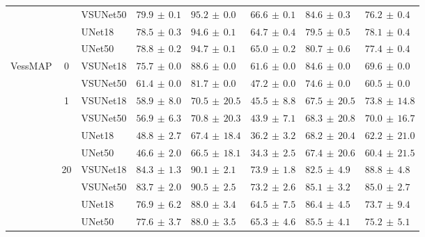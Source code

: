 \documentclass[%
reprint,
nofootinbib,
 amsmath,amssymb,
aps,
floatfix,
superscriptaddress,
showkeys,
longbibliography
]{revtex4-1}
\begin{document}
\begin{table}[t]
\begin{tabular}{l c l l l l l l}
         &  & VSUNet50 & $\mathbf{79.9} \,\pm\, 0.1$ & $95.2 \,\pm\, 0.0$ & $66.6 \,\pm\, 0.1$ & $84.6 \,\pm\, 0.3$ & $76.2 \,\pm\, 0.4$ \\
         &  & UNet18 & $78.5 \,\pm\, 0.3$ & $94.6 \,\pm\, 0.1$ & $64.7 \,\pm\, 0.4$ & $79.5 \,\pm\, 0.5$ & $78.1 \,\pm\, 0.4$ \\
         &  & UNet50 & $78.8 \,\pm\, 0.2$ & $94.7 \,\pm\, 0.1$ & $65.0 \,\pm\, 0.2$ & $80.7 \,\pm\, 0.6$ & $77.4 \,\pm\, 0.4$ \\
        \hline
        \multirow{10}{*}{VessMAP} & \multirow{2}{*}{0} & VSUNet18 & $\mathbf{75.7} \,\pm\, 0.0$ & $88.6 \,\pm\, 0.0$ & $61.6 \,\pm\, 0.0$ & $84.6 \,\pm\, 0.0$ & $69.6 \,\pm\, 0.0$ \\
         &  & VSUNet50 & $61.4 \,\pm\, 0.0$ & $81.7 \,\pm\, 0.0$ & $47.2 \,\pm\, 0.0$ & $74.6 \,\pm\, 0.0$ & $60.5 \,\pm\, 0.0$ \\
         \cline{2-8}
         & \multirow{4}{*}{1} & VSUNet18 & $\mathbf{58.9} \,\pm\, 8.0$ & $70.5 \,\pm\, 20.5$ & $45.5 \,\pm\, 8.8$ & $67.5 \,\pm\, 20.5$ & $73.8 \,\pm\, 14.8$ \\
         &  & VSUNet50 & $56.9 \,\pm\, 6.3$ & $70.8 \,\pm\, 20.3$ & $43.9 \,\pm\, 7.1$ & $68.3 \,\pm\, 20.8$ & $70.0 \,\pm\, 16.7$ \\
         &  & UNet18 & $48.8 \,\pm\, 2.7$ & $67.4 \,\pm\, 18.4$ & $36.2 \,\pm\, 3.2$ & $68.2 \,\pm\, 20.4$ & $62.2 \,\pm\, 21.0$ \\
         &  & UNet50 & $46.6 \,\pm\, 2.0$ & $66.5 \,\pm\, 18.1$ & $34.3 \,\pm\, 2.5$ & $67.4 \,\pm\, 20.6$ & $60.4 \,\pm\, 21.5$ \\
         \cline{2-8}
         & \multirow{4}{*}{20} & VSUNet18 & $\mathbf{84.3} \,\pm\, 1.3$ & $90.1 \,\pm\, 2.1$ & $73.9 \,\pm\, 1.8$ & $82.5 \,\pm\, 4.9$ & $88.8 \,\pm\, 4.8$ \\
         &  & VSUNet50 & $83.7 \,\pm\, 2.0$ & $90.5 \,\pm\, 2.5$ & $73.2 \,\pm\, 2.6$ & $85.1 \,\pm\, 3.2$ & $85.0 \,\pm\, 2.7$ \\
         &  & UNet18 & $76.9 \,\pm\, 6.2$ & $88.0 \,\pm\, 3.4$ & $64.5 \,\pm\, 7.5$ & $86.4 \,\pm\, 4.5$ & $73.7 \,\pm\, 9.4$ \\
         &  & UNet50 & $77.6 \,\pm\, 3.7$ & $88.0 \,\pm\, 3.5$ & $65.3 \,\pm\, 4.6$ & $85.5 \,\pm\, 4.1$ & $75.2 \,\pm\, 5.1$ \\
        \hline
    \end{tabular}
    \endgroup
\end{table}
\end{document}
